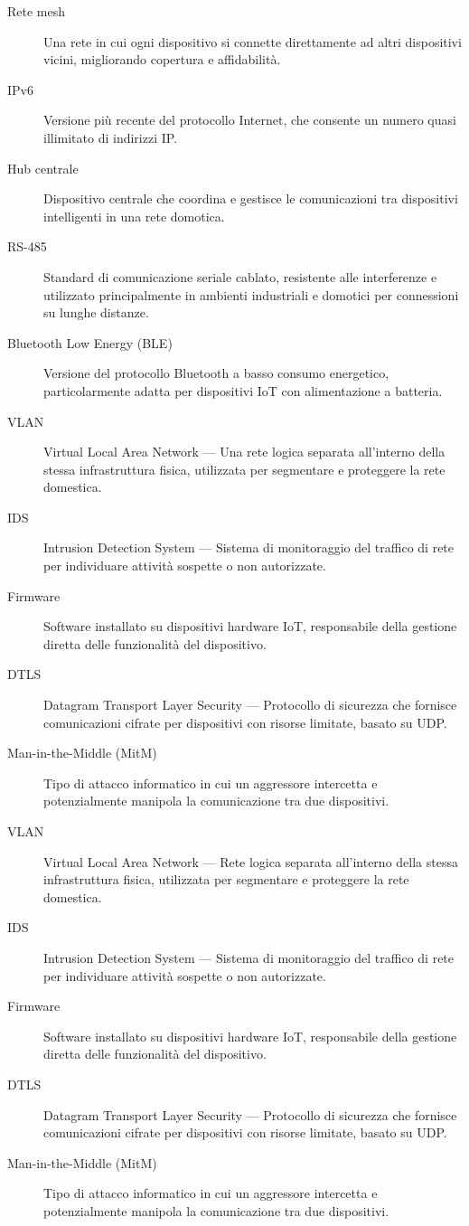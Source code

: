 \begin{description}
    \item[Rete mesh] Una rete in cui ogni dispositivo si connette direttamente ad altri dispositivi vicini, migliorando copertura e affidabilità.
    \item[IPv6] Versione più recente del protocollo Internet, che consente un numero quasi illimitato di indirizzi IP.
    \item[Hub centrale] Dispositivo centrale che coordina e gestisce le comunicazioni tra dispositivi intelligenti in una rete domotica.


    \item[RS-485] Standard di comunicazione seriale cablato, resistente alle interferenze e utilizzato principalmente in ambienti industriali e domotici per connessioni su lunghe distanze.
    \item[Bluetooth Low Energy (BLE)] Versione del protocollo Bluetooth a basso consumo energetico, particolarmente adatta per dispositivi IoT con alimentazione a batteria.

    \item[VLAN] Virtual Local Area Network --- Una rete logica separata all'interno della stessa infrastruttura fisica, utilizzata per segmentare e proteggere la rete domestica.
    \item[IDS] Intrusion Detection System --- Sistema di monitoraggio del traffico di rete per individuare attività sospette o non autorizzate.
    \item[Firmware] Software installato su dispositivi hardware IoT, responsabile della gestione diretta delle funzionalità del dispositivo.
    \item[DTLS] Datagram Transport Layer Security --- Protocollo di sicurezza che fornisce comunicazioni cifrate per dispositivi con risorse limitate, basato su UDP.
    \item[Man-in-the-Middle (MitM)] Tipo di attacco informatico in cui un aggressore intercetta e potenzialmente manipola la comunicazione tra due dispositivi.


    \item[VLAN] Virtual Local Area Network --- Rete logica separata all’interno della stessa infrastruttura fisica, utilizzata per segmentare e proteggere la rete domestica.
    \item[IDS] Intrusion Detection System --- Sistema di monitoraggio del traffico di rete per individuare attività sospette o non autorizzate.
    \item[Firmware] Software installato su dispositivi hardware IoT, responsabile della gestione diretta delle funzionalità del dispositivo.
    \item[DTLS] Datagram Transport Layer Security --- Protocollo di sicurezza che fornisce comunicazioni cifrate per dispositivi con risorse limitate, basato su UDP.
    \item[Man-in-the-Middle (MitM)] Tipo di attacco informatico in cui un aggressore intercetta e potenzialmente manipola la comunicazione tra due dispositivi.

\end{description}